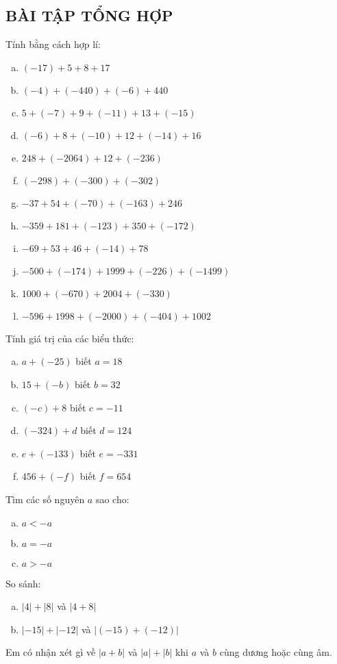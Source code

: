 \begin{bt}
\subsection{BÀI TẬP TỔNG HỢP}
\end{bt}   \begin{bt}
Tính bằng cách hợp lí:
\begin{enumerate}[a)]
\item  $(-17) + 5+8 +17$
\item $(-4) + (-440) + (-6) +440$
\item $5+(-7) +9 + (-11) + 13 + (-15)$
\item $(-6)+8+(-10) + 12 + (-14)+ 16$
\item $248 + (-2064) + 12 + (-236)$
\item $(-298)+(-300)+(-302)$
\item $-37 + 54 + (-70) + (-163) + 246$
\item $-359+181 + (-123) + 350 +(-172)$
\item $-69 + 53+46+ (-14) + 78$
\item $-500 + (-174) + 1999+ (-226)+ (-1499)$
\item $1000 + (-670) + 2004 + (-330)$
\item $-596 + 1998 + (-2000) + (-404) + 1002$
\end{enumerate}

\end{bt}   \begin{bt}
Tính giá trị của các biểu thức:
\begin{enumerate}[a)]
\item $a + (-25)$ biết $a = 18$
\item $15 + (-b)$ biết $b = 32$
\item $(-c) + 8$ biết $c = -11$
\item $(-324) + d$ biết $d = 124$
\item $e+ (-133)$ biết $e= -331$
\item $456 + (-f)$ biết $f= 654$
\end{enumerate}

\end{bt}   \begin{bt}
Tìm các số nguyên $a$ sao cho:
\begin{enumerate}[a)]
\item $a< -a$
\item $a=-a$
\item $a>-a$
\end{enumerate}

\end{bt}   \begin{bt}
So sánh:
\begin{enumerate}[a)]
\item $|4| + |8| $ và $|4+8|$
\item $|-15| + |-12|$ và $|(-15)+(-12)|$
\end{enumerate}
Em có nhận xét gì về $|a+b|$ và $|a| + |b|$ khi $a$ và $b$ cùng dương hoặc cùng âm.


\end{bt}
